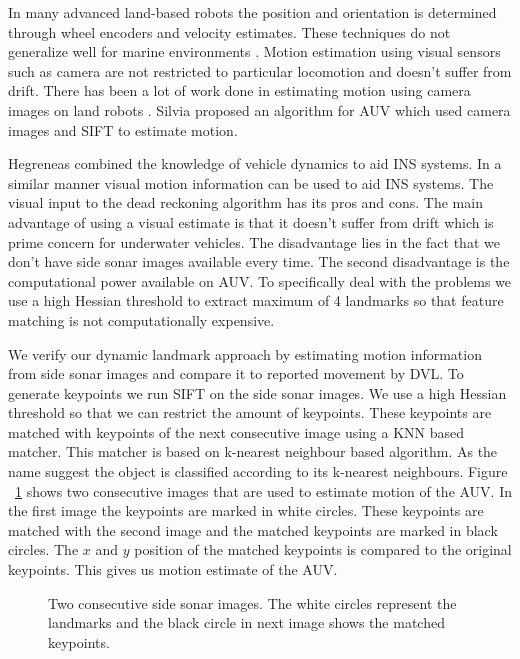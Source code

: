 \documentclass[12pt]{dalcsthesis}
\begin{document}
In many advanced land-based robots the position and orientation is determined through wheel encoders and velocity estimates. These techniques do not generalize well for marine environments \cite{Silva}. Motion estimation using visual sensors such as camera are not restricted to particular locomotion and doesn't suffer from drift. There has been a lot of work done in estimating motion using camera images on land robots \cite{barfoot2005online} \cite{scaramuzza2008appearance}. Silvia \cite{Silva} proposed an algorithm for AUV which used camera images and SIFT to estimate motion. 

Hegreneas \cite{hegrenaes2008model} combined the knowledge of vehicle dynamics to aid INS systems. In a similar manner visual motion information can be used to aid INS systems. The visual input to the dead reckoning algorithm has its pros and cons. The main advantage of using a visual estimate is that it doesn't suffer from drift which is prime concern for underwater vehicles. The disadvantage lies in the fact that we don't have side sonar images available every time. The second disadvantage is the computational power available on AUV. To specifically deal with the problems we use a high Hessian threshold to extract maximum of 4 landmarks so that feature matching is not computationally expensive.    

We verify our dynamic landmark approach by estimating motion information from side sonar images and compare it to reported movement by DVL. To generate keypoints we run SIFT on the side sonar images. We use a high Hessian threshold so that we can restrict the amount of keypoints. These keypoints are matched with keypoints of the next consecutive image using a KNN based matcher. This matcher is based on k-nearest neighbour based algorithm. As the name suggest the object is classified according to its k-nearest neighbours.  Figure ~\ref{fig- matched images} shows two consecutive images that are used to estimate motion of the AUV. In the first image the keypoints are marked in white circles. These keypoints are matched with the second image and the matched keypoints are marked in black circles. The $x$ and $y$ position of the matched keypoints is compared to the original keypoints. This gives us motion estimate of the AUV. 

\begin{figure}
  \centering
  \qquad
  \qquad
 \caption{\label{fig- matched images}Two consecutive side sonar images. The white circles represent the landmarks and the black circle in next image shows the matched keypoints.}
\end{figure}
\end{document}
